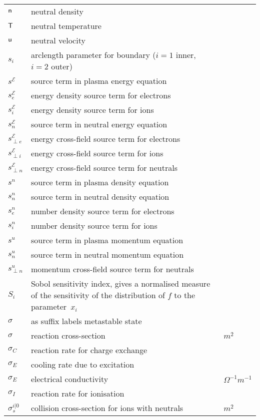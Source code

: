 \begin{longtable}{|p{3.0cm}|p{10.0cm}|p{3.0cm}|}
${\sf n}$ & neutral density  & \\
${\sf T}$ & neutral temperature  & \\
${\sf u}$ & neutral velocity  & \\
$s_i$ & arclength parameter for boundary ($i=1$ inner, $i=2$ outer) & \\
$s^\mathcal{E}$ & source term in plasma energy equation  &  \\
$s^{\mathcal{E}}_{e}$ & energy density source term for electrons  &  \\
$s^{\mathcal{E}}_{i}$ & energy density source term for ions  &  \\
$s^\mathcal{E}_n$ & source term in neutral energy equation  &  \\
$s^\mathcal{E}_{\perp e}$ & energy cross-field source term for electrons  &  \\
$s^\mathcal{E}_{\perp i}$ & energy cross-field source term for ions   &  \\
$s^\mathcal{E}_{\perp n}$ & energy cross-field source term for neutrals  &  \\
$s^n$ & source term in plasma density equation  &  \\
$s^n_n$ & source term in neutral density equation  &  \\
$s^n_{e}$ & number density source term for electrons  &  \\
$s^n_{i}$ & number density source term for ions  &  \\
$s^u$ & source term in plasma momentum equation  &  \\
$s^u_n$ & source term in neutral momentum equation   &  \\
$s^u_{\perp n}$ & momentum cross-field source term for neutrals  &  \\
$S_i$ & Sobol sensitivity index, gives a normalised measure of the sensitivity of the distribution of $f$ to the parameter~$x_i$  & \\
$\sigma$ & as suffix labels metastable state & \\
$\sigma$ & reaction cross-section  & $m^2$ \\
$\sigma_C$ & reaction rate for charge exchange  & \\
$\sigma_E$ & cooling rate due to excitation  & \\
$\sigma_E$ & electrical conductivity  & $\Omega^{-1} m^{-1}$ \\
$\sigma_I$ & reaction rate for ionisation  & \\
$\sigma_s^{i|0}$ & collision cross-section for ions with neutrals  & $m^2$ \\

\end{longtable}
